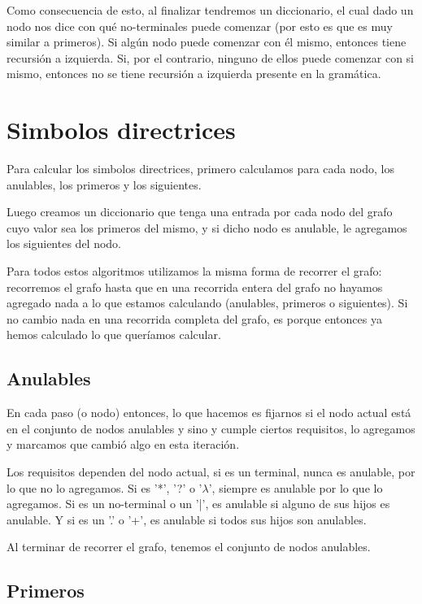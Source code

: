 \documentclass[a4paper]{report}
\begin{document}
	Como consecuencia de esto, al finalizar tendremos un diccionario, el cual dado un nodo nos
dice con qué no-terminales puede comenzar (por esto es que es muy similar a
primeros). Si algún nodo puede comenzar con él mismo, entonces tiene recursión a
izquierda. Si, por el contrario, ninguno de ellos puede comenzar con si mismo, entonces no se tiene
recursión a izquierda presente en la gram\'atica.


\section*{Simbolos directrices}

Para calcular los simbolos directrices, primero calculamos para cada nodo, los
anulables, los primeros y los siguientes.


Luego creamos un diccionario que tenga una entrada por cada nodo del grafo cuyo
valor sea los primeros del mismo, y si dicho nodo es anulable, le agregamos los
siguientes del nodo.


Para todos estos algoritmos utilizamos la misma forma de recorrer el grafo:
recorremos el grafo hasta que en una recorrida entera del grafo no hayamos
agregado nada a lo que estamos calculando (anulables, primeros o siguientes). Si
no cambio nada en una recorrida completa del grafo, es porque entonces ya hemos
calculado lo que queríamos calcular.

\subsection*{Anulables}

	En cada paso (o nodo) entonces, lo que hacemos es fijarnos si el nodo
actual está en el conjunto de nodos anulables y sino y cumple ciertos
requisitos, lo agregamos y marcamos que cambió algo en esta iteración.


	Los requisitos dependen del nodo actual, si es un terminal, nunca es
anulable, por lo que no lo agregamos. Si es '*', '?' o '$\lambda$', siempre es anulable
por lo que lo agregamos. Si es un no-terminal o un '|', es anulable si alguno de
sus hijos es anulable. Y si es un '.' o '+', es anulable si todos sus hijos son
anulables.


	Al terminar de recorrer el grafo, tenemos el conjunto de nodos
anulables.

\subsection*{Primeros}
\end{document}
